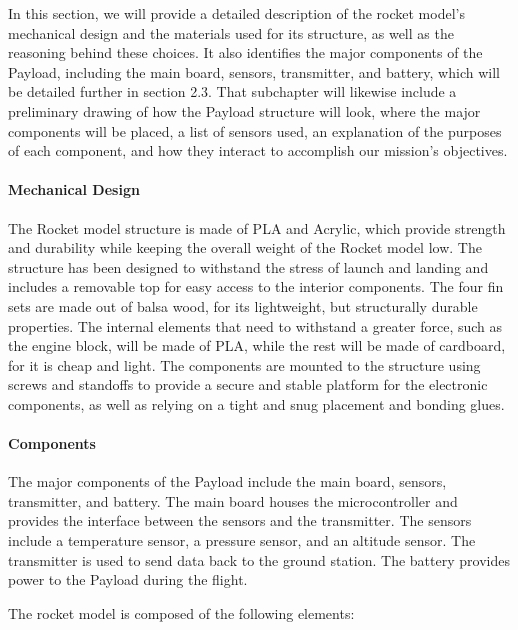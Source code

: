 In this section, we will provide a detailed description of the rocket model’s mechanical design and the materials used for its structure, as well as the reasoning behind these choices. It also identifies the major components of the Payload, including the main board, sensors, transmitter, and battery, which will be detailed further in section 2.3. That subchapter will likewise include a preliminary drawing of how the Payload structure will look, where the major components will be placed, a list of sensors used, an explanation of the purposes of each component, and how they interact to accomplish our mission’s objectives.

\paragraph{Mechanical Design}

The Rocket model structure is made of PLA and Acrylic, which provide strength and durability while keeping the overall weight of the Rocket model low. The structure has been designed to withstand the stress of launch and landing and includes a removable top for easy access to the interior components. The four fin sets are made out of balsa wood, for its lightweight, but structurally durable properties. The internal elements that need to withstand a greater force, such as the engine block, will be made of PLA, while the rest will be made of cardboard, for it is cheap and light. The components are mounted to the structure using screws and standoffs to provide a secure and stable platform for the electronic components, as well as relying on a tight and snug placement and bonding glues.

\paragraph{Components}

The major components of the Payload include the main board, sensors, transmitter, and battery. The main board houses the microcontroller and provides the interface between the sensors and the transmitter. The sensors include a temperature sensor, a pressure sensor, and an altitude sensor. The transmitter is used to send data back to the ground station. The battery provides power to the Payload during the flight.

The rocket model is composed of the following elements:

